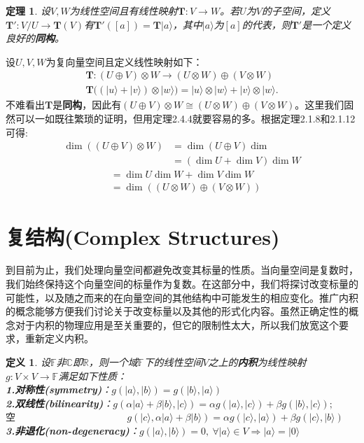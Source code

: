 \documentclass[mathserif,hyperref,UTF8,openany,b5paper]{ctexbook}
\newtheorem{defn}{定义}[section]
\newtheorem{thm}{定理}[section]
\begin{document}
\begin{thm}
设$V,W$为线性空间且有线性映射$\mathbf{T}:V\xrightarrow{}W$。若$U$为$V$的子空间，定义$\mathbf{T}':V/U\xrightarrow{}\mathbf{T}(V)$有$\mathbf{T'}([a])=\mathbf{T}|a\rangle$，其中$|a\rangle$为$[a]$的代表，则$\mathbf{T'}$是一个定义良好的\textbf{同构}。
\end{thm}
设$U,V,W$为复向量空间且定义线性映射如下：
\begin{align}
    \mathbf{T}:(U\oplus V)\otimes W \xrightarrow{}(U\otimes W)\oplus(V\otimes W)\\
    \mathbf{T}((|u\rangle+|v\rangle)\otimes|w\rangle)=|u\rangle\otimes |w\rangle+|v\rangle\otimes|w\rangle.
\end{align}
不难看出$\mathbf{T}$是\textbf{同构}，因此有$(U\oplus V)\otimes W \cong (U\otimes W)\oplus(V\otimes W)$。这里我们固然可以一如既往繁琐的证明，但用定理2.4.4就要容易的多。根据定理2.1.8和2.1.12可得:
\begin{align}
\dim ((U\oplus V)\otimes W) &= \dim(U\oplus V)\dim\\
&=(\dim U + \dim V)\dim W
\end{align}
\begin{align}
&= \dim U\dim W +\dim V\dim W \\
&= \dim((U\otimes W)\oplus(V\otimes W))
\end{align}
\section{复结构(Complex Structures)}
到目前为止，我们处理向量空间都避免改变其标量的性质。当向量空间是复数时，我们始终保持这个向量空间的标量作为复数。在这部分中，我们将探讨改变标量的可能性，以及随之而来的在向量空间的其他结构中可能发生的相应变化。推广内积的概念能够方便我们讨论关于改变标量以及其他的形式化内容。虽然正确定性的概念对于内积的物理应用是至关重要的，但它的限制性太大，所以我们放宽这个要求，重新定义内积。
\begin{defn}
设$\mathbb{F}$非$\mathbb{C}$即$\mathbb{R}$，则一个域$\mathbb{F}$下的线性空间$V$之上的\textbf{内积}为线性映射$g:V\times V\xrightarrow{}\mathbb{F}$满足如下性质：\\
\textbf{1.}\textbf{对称性(symmetry)}：$g(|a\rangle,|b\rangle)=g(|b\rangle,|a\rangle)$\\
\textbf{2.}\textbf{双线性(bilinearity)}：$g(\alpha|a\rangle+\beta|b\rangle,|c\rangle)=\alpha g(|a\rangle,|c\rangle)+\beta g(|b\rangle,|c\rangle);$\\$空\qquad\qquad\qquad\qquad\qquad\quad \ \, g(|c\rangle,\alpha|a\rangle+\beta|b\rangle)=\alpha g(|c\rangle,|a\rangle)+\beta g(|c\rangle,|b\rangle)$\\
\textbf{3.}\textbf{非退化(non-degeneracy)}：$g(|a\rangle,|b\rangle)=0,\ \forall|a\rangle\in V \Rightarrow |a\rangle=|0\rangle$
\end{defn}
\end{document}
